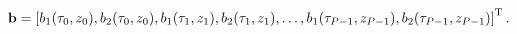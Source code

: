 \[\mathbf{b}=\left[b_{1}(\tau_{0},z_{0}),b_{2}(\tau_{0},z_{0}),b_{1}(\tau_{1},z_%
{1}),b_{2}(\tau_{1},z_{1}),\ldots,b_{1}(\tau_{P-1},z_{P-1}),b_{2}(\tau_{P-1},z%
_{P-1})\right]^{\rm T}.\]